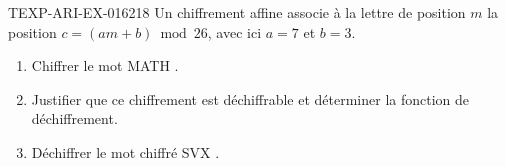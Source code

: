 \begin{exercice}{TEXP-ARI-EX-016}{2}{18}
Un chiffrement affine associe à la lettre de position $m$ la position
$c=(am+b)\bmod26$, avec ici $a=7$ et $b=3$.
\begin{enumerate}
  \item Chiffrer le mot \og MATH \fg.
  \item Justifier que ce chiffrement est déchiffrable et déterminer la fonction
        de déchiffrement.
  \item Déchiffrer le mot chiffré \og SVX \fg.
\end{enumerate}
\end{exercice}
